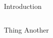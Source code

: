 \begin{frame}{Introduction}
\begin{columns}
\centering
\begin{outline}
  \1 Thing
  \2 Another
\end{outline}

\begin{center}
\centering


\end{center}
\end{columns}
\end{frame}

